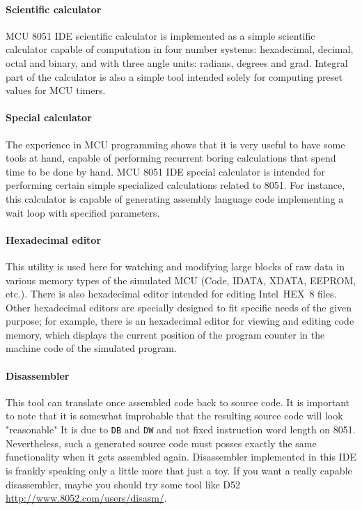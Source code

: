 \documentclass[a4paper,twoside,12pt]{book}
\begin{document}
		\paragraph{Scientific calculator} MCU 8051 IDE scientific calculator is implemented as a simple scientific calculator capable of computation in four number systems: hexadecimal, decimal, octal and binary, and with three angle units: radians, degrees and grad. Integral part of the calculator is also a simple tool intended solely for computing preset values for MCU timers.

		\paragraph{Special calculator} The experience in MCU programming shows that it is very useful to have some tools at hand, capable of performing recurrent boring calculations that spend time to be done by hand. MCU 8051 IDE special calculator is intended for performing certain simple specialized calculations related to 8051. For instance, this calculator is capable of generating assembly language code implementing a wait loop with specified parameters.

		\paragraph{Hexadecimal editor} This utility is used here for watching and modifying large blocks of raw data in various memory types of the simulated MCU (Code, IDATA, XDATA, EEPROM, etc.). There is also hexadecimal editor intended for editing Intel\textregistered{}~HEX~8 files. Other hexadecimal editors are specially designed to fit specific needs of the given purpose; for example, there is an hexadecimal editor for viewing and editing code memory, which displays the current position of the program counter in the machine code of the simulated program.

		\paragraph{Disassembler} This tool can translate once assembled code back to source code. It is important to note that it is somewhat improbable that the resulting source code will look "reasonable" It is due to \texttt{DB} and \texttt{DW} and not fixed instruction word length on 8051. Nevertheless, such a generated source code must posses exactly the same functionality when it gets assembled again. Disassembler implemented in this IDE is frankly speaking only a little more that just a toy. If you want a really capable disassembler, maybe you should try some tool like D52 \url{http://www.8052.com/users/disasm/}.
\end{document}
